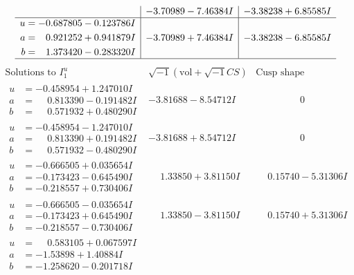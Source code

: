 \documentclass[1p]{elsarticle_modified}
\theoremstyle{definition}
\newcommand{\I}{\sqrt{-1}}
\begin{document}
$$\begin{array}{c|c|c}
 & -3.70989 - 7.46384 I & -3.38238 + 6.85585 I \\ \hline\begin{aligned}
u &= -0.687805 - 0.123786 I \\
a &= \phantom{-}0.921252 + 0.941879 I \\
b &= \phantom{-}1.373420 - 0.283320 I\end{aligned}
 & -3.70989 + 7.46384 I & -3.38238 - 6.85585 I\\
 \hline 
 \end{array}$$\newpage$$\begin{array}{c|c|c}  
\text{Solutions to }I^u_{1}& \I (\text{vol} + \sqrt{-1}CS) & \text{Cusp shape}\\
 \hline 
\begin{aligned}
u &= -0.458954 + 1.247010 I \\
a &= \phantom{-}0.813390 - 0.191482 I \\
b &= \phantom{-}0.571932 + 0.480290 I\end{aligned}
 & -3.81688 - 8.54712 I & \phantom{-0.000000 } 0 \\ \hline\begin{aligned}
u &= -0.458954 - 1.247010 I \\
a &= \phantom{-}0.813390 + 0.191482 I \\
b &= \phantom{-}0.571932 - 0.480290 I\end{aligned}
 & -3.81688 + 8.54712 I & \phantom{-0.000000 } 0 \\ \hline\begin{aligned}
u &= -0.666505 + 0.035654 I \\
a &= -0.173423 - 0.645490 I \\
b &= -0.218557 + 0.730406 I\end{aligned}
 & \phantom{-}1.33850 + 3.81150 I & \phantom{-}0.15740 - 5.31306 I \\ \hline\begin{aligned}
u &= -0.666505 - 0.035654 I \\
a &= -0.173423 + 0.645490 I \\
b &= -0.218557 - 0.730406 I\end{aligned}
 & \phantom{-}1.33850 - 3.81150 I & \phantom{-}0.15740 + 5.31306 I \\ \hline\begin{aligned}
u &= \phantom{-}0.583105 + 0.067597 I \\
a &= -1.53898 + 1.40884 I \\
b &= -1.258620 - 0.201718 I\end{aligned}

\end{array}$$
\end{document}
